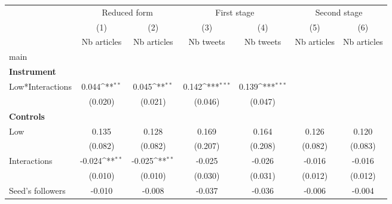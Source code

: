 {
\def\sym#1{\ifmmode^{#1}\else\(^{#1}\)\fi}
\begin{tabular}{l*{6}{c}}
\hline\hline
                    &\multicolumn{2}{c}{Reduced form}           &\multicolumn{2}{c}{First stage}            &\multicolumn{2}{c}{Second stage}           \\\cmidrule(lr){2-3}\cmidrule(lr){4-5}\cmidrule(lr){6-7}
                    &\multicolumn{1}{c}{(1)}&\multicolumn{1}{c}{(2)}&\multicolumn{1}{c}{(3)}&\multicolumn{1}{c}{(4)}&\multicolumn{1}{c}{(5)}&\multicolumn{1}{c}{(6)}\\
                    &\multicolumn{1}{c}{Nb articles}&\multicolumn{1}{c}{Nb articles}&\multicolumn{1}{c}{Nb tweets}&\multicolumn{1}{c}{Nb tweets}&\multicolumn{1}{c}{Nb articles}&\multicolumn{1}{c}{Nb articles}\\
\hline
main                &                     &                     &                     &                     &                     &                     \\
\textbf{Instrument} &                     &                     &                     &                     &                     &                     \\
Low*Interactions    &       0.044\sym{**} &       0.045\sym{**} &       0.142\sym{***}&       0.139\sym{***}&                     &                     \\
                    &     (0.020)         &     (0.021)         &     (0.046)         &     (0.047)         &                     &                     \\
\textbf{Controls}   &                     &                     &                     &                     &                     &                     \\
Low                 &       0.135         &       0.128         &       0.169         &       0.164         &       0.126         &       0.120         \\
                    &     (0.082)         &     (0.082)         &     (0.207)         &     (0.208)         &     (0.082)         &     (0.083)         \\
Interactions        &      -0.024\sym{**} &      -0.025\sym{**} &      -0.025         &      -0.026         &      -0.016         &      -0.016         \\
                    &     (0.010)         &     (0.010)         &     (0.030)         &     (0.031)         &     (0.012)         &     (0.012)         \\
Seed’s followers    &      -0.010         &      -0.008         &      -0.037         &      -0.036         &      -0.006         &      -0.004         \\

\end{tabular}}
